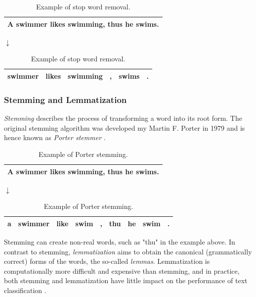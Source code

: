 \documentclass{article}
\begin{document}
\begin{table}[H]
\caption{Example of stop word removal.}
\begin{center}
\begin{tabular}{ | c | }
\hline
A swimmer likes swimming, thus he swims. \\ \hline
\end{tabular}

$\downarrow$

\begin{tabular}{ | c | c | c |  c | c | c | }
\hline
swimmer & likes & swimming & , &  swims &. \\ \hline
\end{tabular}
\end{center}
\end{table}


\subsubsection{Stemming and Lemmatization} 
\label{sec:stemming_and_lemmatization}

\emph{Stemming} describes the process of transforming a word into its root form. The original stemming algorithm was developed my Martin F. Porter in 1979 and is hence known as \emph{Porter stemmer} \cite{porter1980algorithm}. 

\begin{table}[H]
\caption{Example of Porter stemming.}
\begin{center}
\begin{tabular}{ | c | }
\hline
A swimmer likes swimming, thus he swims. \\ \hline
\end{tabular}

$\downarrow$

\begin{tabular}{ | c | c | c |  c | c | c | c | c | c | }
\hline
a & swimmer &  like & swim & , & thu & he & swim & .\\ \hline
\end{tabular}
\end{center}
\end{table}

Stemming can create non-real words, such as "thu" in the example above. In contrast to stemming, \emph{lemmatization} aims to obtain the canonical (grammatically correct) forms of the words, the so-called \emph{lemmas}. Lemmatization is computationally more difficult and expensive than stemming, and in practice, both stemming and lemmatization have little impact on the performance of text classification \cite{toman2006influence}.
\end{document}

